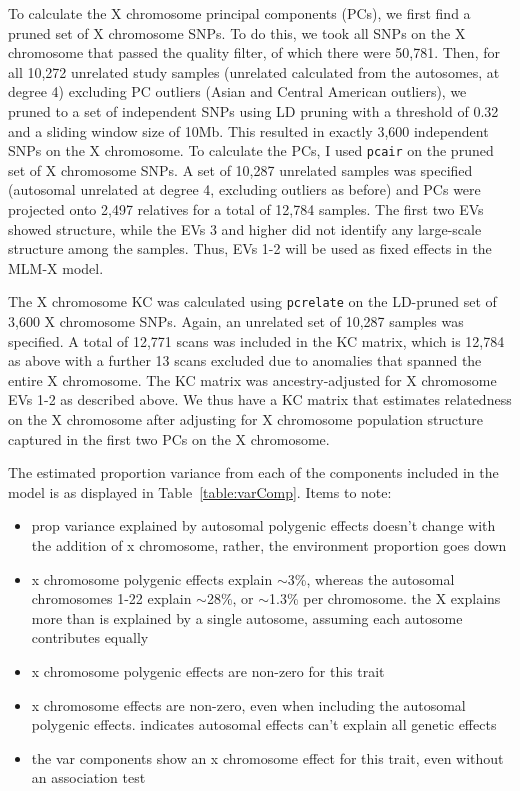 \documentclass[11pt]{article} %
\begin{document}
To calculate the X chromosome principal components (PCs), we first find a pruned set of X chromosome SNPs.
To do this, we took all SNPs on the X chromosome that passed the quality filter, of which there were 50,781. Then, for all 10,272 unrelated study samples (unrelated calculated from the autosomes, at degree 4) excluding PC outliers (Asian and Central American outliers), we pruned to a set of independent SNPs using LD pruning with a threshold of 0.32 and a sliding window size of 10Mb. This resulted in exactly 3,600 independent SNPs on the X chromosome.
To calculate the PCs, I used \texttt{pcair} on the pruned set of X chromosome SNPs. A set of 10,287 unrelated samples was specified (autosomal unrelated at degree 4, excluding outliers as before) and PCs were projected onto 2,497 relatives for a total of 12,784 samples.
The first two EVs showed structure, while the EVs 3 and higher did not identify any large-scale structure among the samples. Thus, EVs 1-2 will be used as fixed effects in the MLM-X model.

The X chromosome KC was calculated using \texttt{pcrelate} on the LD-pruned set of 3,600 X chromosome SNPs. Again, an unrelated set of 10,287 samples was specified. A total of 12,771 scans was included in the KC matrix, which is 12,784 as above with a further 13 scans excluded due to anomalies that spanned the entire X chromosome. The KC matrix was ancestry-adjusted for X chromosome EVs 1-2 as described above. We thus have a KC matrix that estimates relatedness on the X chromosome after adjusting for X chromosome population structure captured in the first two PCs on the X chromosome.

The estimated proportion variance from each of the components included in the model is as displayed in Table~\ref{table:varComp}. 
Items to note:
\begin{itemize}
\item prop variance explained by autosomal polygenic effects doesn't change with the addition of x chromosome, rather, the environment proportion goes down
\item x chromosome polygenic effects explain $\sim$3\%, whereas the autosomal chromosomes 1-22 explain $\sim$28\%, or $\sim$1.3\% per chromosome. the X explains more than is explained by a single autosome, assuming each autosome contributes equally
\item x chromosome polygenic effects are non-zero for this trait
\item x chromosome effects are non-zero, even when including the autosomal polygenic effects. indicates autosomal effects can't explain all genetic effects
\item the var components show an x chromosome effect for this trait, even without an association test
\end{itemize}
\end{document}
